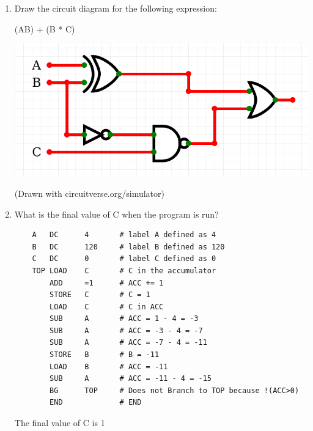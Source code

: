 \documentclass[12pt,a4paper,english]{article}
\newcommand\answer[1]{\color{blue}#1\color{black}}
\begin{document}
\begin{enumerate}
\color{black}\item Draw the circuit diagram for the following expression:
 
  (A\oplus B) + \lnot(\lnot B * C)
 
  \includegraphics[scale=.5]{logicdrawing}
 
  \answer{(Drawn with circuitverse.org/simulator)}

\item What is the final value of C when the program is run?
  \begin{lstlisting}
    A   DC      4       # label A defined as 4
    B   DC      120     # label B defined as 120
    C   DC      0       # label C defined as 0
    TOP LOAD    C       # C in the accumulator
        ADD     =1      # ACC += 1
        STORE   C       # C = 1
        LOAD    C       # C in ACC
        SUB     A       # ACC = 1 - 4 = -3
        SUB     A       # ACC = -3 - 4 = -7
        SUB     A       # ACC = -7 - 4 = -11
        STORE   B       # B = -11
        LOAD    B       # ACC = -11
        SUB     A       # ACC = -11 - 4 = -15
        BG      TOP     # Does not Branch to TOP because !(ACC>0)
        END             # END 
\end{lstlisting}
\answer{The final value of C is 1}

\end{enumerate}
\end{document}
